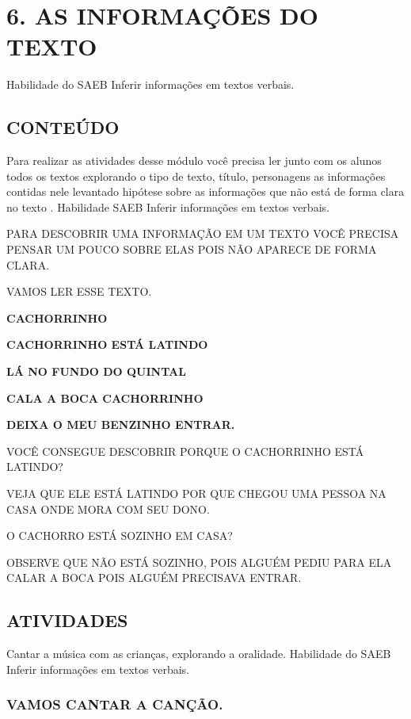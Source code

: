 \section{6. AS INFORMAÇÕES DO
TEXTO}\label{muxf3dulo-6-as-informauxe7uxf5es-do-texto}

\protect\hypertarget{_heading=h.1pxezwc}{}{}Habilidade do SAEB
Inferir informações em textos verbais.

\subsection{CONTEÚDO}\label{conteuxfado-5}

Para realizar as atividades desse módulo você precisa ler junto com os
alunos todos os textos explorando o tipo de texto, título, personagens
as informações contidas nele levantado hipótese sobre as informações que
não está de forma clara no texto . Habilidade SAEB Inferir informações
em textos verbais.

PARA DESCOBRIR UMA INFORMAÇÃO EM UM TEXTO VOCÊ PRECISA PENSAR UM POUCO
SOBRE ELAS POIS NÃO APARECE DE FORMA CLARA.

VAMOS LER ESSE TEXTO.

\textbf{CACHORRINHO}

\textbf{CACHORRINHO ESTÁ LATINDO}

\textbf{LÁ NO FUNDO DO QUINTAL}

\textbf{CALA A BOCA CACHORRINHO}

\textbf{DEIXA O MEU BENZINHO ENTRAR.}

VOCÊ CONSEGUE DESCOBRIR PORQUE O CACHORRINHO ESTÁ LATINDO?

VEJA QUE ELE ESTÁ LATINDO POR QUE CHEGOU UMA PESSOA NA CASA ONDE MORA
COM SEU DONO.

O CACHORRO ESTÁ SOZINHO EM CASA?

OBSERVE QUE NÃO ESTÁ SOZINHO, POIS ALGUÉM PEDIU PARA ELA CALAR A BOCA
POIS ALGUÉM PRECISAVA ENTRAR.

\subsection{ATIVIDADES}\label{atividades-5}

Cantar a música com as crianças, explorando a oralidade. Habilidade do SAEB
Inferir informações em textos verbais.

\subsubsection{VAMOS CANTAR A
CANÇÃO.}\label{vamos-cantar-a-canuxe7uxe3o.}

